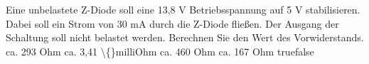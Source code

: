    {Eine unbelastete Z-Diode soll eine 13,8 V Betriebsspannung auf 5 V stabilisieren. Dabei soll ein Strom von 30 mA durch die Z-Diode fließen. Der Ausgang der Schaltung soll nicht belastet werden. Berechnen Sie den Wert des Vorwiderstands.}
    {ca. 293 Ohm}
    {ca. 3,41 \textbackslash\{\}milliOhm}
    {ca. 460 Ohm}
    {ca. 167 Ohm}
    {true}{false}
